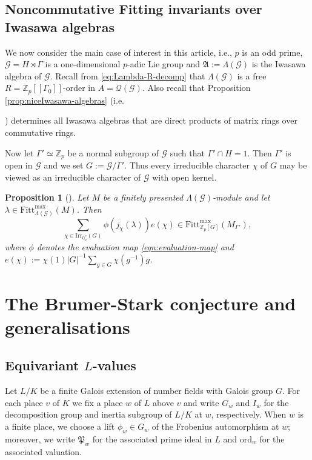 \documentclass[12pt]{amsart}
\theoremstyle{plain}
\newtheorem{prop}[theorem]{Proposition}
\theoremstyle{remark}
\theoremstyle{definition}
\numberwithin{equation}{section}
\begin{document}
\subsection{Noncommutative Fitting invariants over Iwasawa algebras}\label{subsec:noncomm-fitt-over-Iwasawa}
We now consider the main case of interest in this article, i.e., $p$ is an odd prime,
$\mathcal{G} = H \rtimes \Gamma$ is a one-dimensional $p$-adic Lie group and $\mathfrak{A} := \Lambda(\mathcal{G})$ is the Iwasawa algebra of
$\mathcal{G}$.
Recall from \eqref{eq:Lambda-R-decomp} that $\Lambda(\mathcal{G})$ is a free
$R = {\mathbb{Z}}_{p}[[\Gamma_{0}]]$-order in $A = \mathcal{Q}(\mathcal{G})$.
Also recall that Proposition \ref{prop:niceIwasawa-algebras} (i.e.\ {\cite[Proposition 4.5]{MR3092262})
determines all Iwasawa algebras that are direct products of matrix rings over commutative rings.

Now let $\Gamma' \simeq {\mathbb{Z}}_{p}$ be a normal subgroup of $\mathcal{G}$ such that $\Gamma' \cap H = 1$.
Then $\Gamma'$ is open in $\mathcal{G}$ and we set $G := \mathcal{G} / \Gamma'$.
Thus every irreducible character $\chi$ of $G$ may be viewed as an irreducible character of $\mathcal{G}$ with open kernel.

\begin{prop}[{\cite[Theorem 6.4]{MR2609173}}]\label{prop:Fitting-descent}
Let $M$ be a finitely presented $\Lambda(\mathcal{G})$-module and let $\lambda \in {\mathrm{Fitt}}_{\Lambda(\mathcal{G})}^{\max}(M)$.
Then
\[
     \sum_{\chi \in {\mathrm{Irr}}_{{\mathbb{Q}}_{p}^{c}}(G)} \phi(j_{\chi}(\lambda)) e(\chi) \in {\mathrm{Fitt}}_{{\mathbb{Z}}_{p}[G]}^{\max}(M_{\Gamma'}),
\]
where $\phi$ denotes the evaluation map \eqref{eqn:evaluation-map} and $e(\chi) := \chi(1) |G|^{-1} \sum_{g \in G} \chi(g^{-1}) g$.
\end{prop}

\section{The Brumer-Stark conjecture and generalisations} \label{sec:Brumer-Stark}

\subsection{Equivariant $L$-values} \label{subsec:L-values}
Let $L/K$ be a finite Galois extension of number fields with Galois group $G$.
For each place $v$ of $K$ we fix a place $w$ of $L$ above $v$ and write $G_{w}$ and $I_{w}$ for the decomposition
group and inertia subgroup of $L/K$ at $w$, respectively.
When $w$ is a finite place, we  choose a lift $\phi_{w} \in G_{w}$ of the Frobenius automorphism at $w$;
moreover, we write $\mathfrak{P}_{w}$ for the associated prime ideal in $L$ and ${\mathrm{ord}}_{w}$ for the associated valuation.

}
\end{document}
